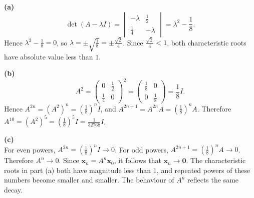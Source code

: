 \begin{solution}
\textbf{(a)}\\
\[ \det(A-\lambda I) = \begin{vmatrix} -\lambda & \frac12\\[2mm] \frac14 & -\lambda \end{vmatrix} = \lambda^2-\frac18. \]
Hence $\lambda^2-\frac18=0$, so $\lambda = \pm\sqrt{\frac18} = \pm\frac{\sqrt2}{4}$. Since $\frac{\sqrt2}{4}<1$, both characteristic roots have absolute value less than $1$.

\textbf{(b)}\\
\[ A^2 = \begin{pmatrix} 0 & \frac12\\ \frac14 & 0 \end{pmatrix}^2 = \begin{pmatrix} \frac18&0\\ 0&\frac18 \end{pmatrix} = \frac18I. \]
Hence $A^{2n} = (A^2)^n = \left(\frac18\right)^nI$, and $A^{2n+1} = A^{2n}A = \left(\frac18\right)^nA$.
Therefore $A^{10} = (A^2)^5 = \left(\frac18\right)^5I = \frac1{32768}I$.

\textbf{(c)}\\
For even powers, $A^{2n} = \left(\frac18\right)^nI \to0$. For odd powers, $A^{2n+1} = \left(\frac18\right)^nA \to0$. Therefore $\boxed{A^n\to0}$.
Since $\mathbf{x}_n=A^n\mathbf{x}_0$, it follows that $\boxed{\mathbf{x}_n\to\mathbf0}$.
The characteristic roots in part (a) both have magnitude less than $1$, and repeated powers of these numbers become smaller and smaller. The behaviour of $A^n$ reflects the same decay.


\end{solution}
